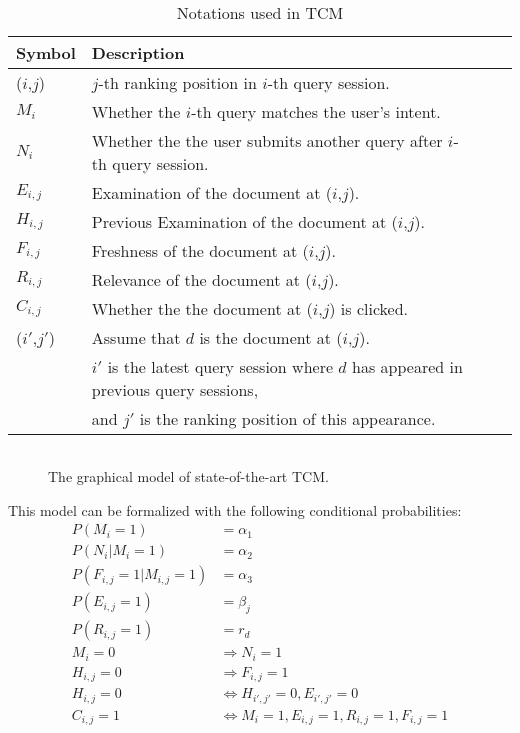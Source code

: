 \begin{table}[ht]
	\centering
	\begin{tabular}{l|lll|}
		\hline
		Symbol & Description \\
		\hline
		(\(i\),\(j\)) 	& \(j\)-th ranking position in \(i\)-th query session.\\
		$M_i$			& Whether the \(i\)-th query matches the user's intent.\\
		$N_i$ 			& Whether the the user submits another query after \(i\)-th query session.\\		
		$E_{i,j}$ 		& Examination of the document at (\(i\),\(j\)).\\
		$H_{i,j}$ 		& Previous Examination of the document at (\(i\),\(j\)).\\
		$F_{i,j}$ 		& Freshness of the document at (\(i\),\(j\)).\\
		$R_{i,j}$ 		& Relevance of the document at (\(i\),\(j\)).\\
		$C_{i,j}$ 		& Whether the the document at (\(i\),\(j\)) is clicked.\\
		(\(i'\),\(j'\)) & Assume that \(d\) is the document at (\(i\),\(j\)).\\
		&\(i'\) is the latest query session where \(d\) has appeared in previous query sessions,\\ &and \(j'\) is the ranking position of this appearance.\\
		\hline
	\end{tabular}
	\caption{Notations used in TCM}
	\label{table:tcm_notations}
\end{table}

\begin{figure}[ht!]
	\begin{center}
		\begin{tabular}{c}
			
		\end{tabular}
	\end{center}
	\caption{The graphical model of state-of-the-art TCM.}
	\label{fig:tcm_gm}
\end{figure}

This model can be formalized with the following conditional probabilities:
\begin{align}
	P(M_i=1) &= \alpha_1 \\
	\label{eq:alpha_2}
	P(N_i|M_i=1) &= \alpha_2 \\
	P(F_{i,j}=1|M_{i,j}=1) &= \alpha_3 \\
	P(E_{i,j}=1) &= \beta_j \\
	P(R_{i,j}=1) &= r_d \\
	M_i = 0 &\Rightarrow N_i = 1\\
	H_{i,j} = 0 &\Rightarrow F_{i,j} = 1\\
	H_{i,j} = 0 &\Leftrightarrow H_{i',j'} = 0, E_{i',j'} = 0\\
	C_{i,j} = 1 &\Leftrightarrow M_i = 1, E_{i,j} = 1, R_{i,j} = 1, F_{i,j} = 1
\end{align}


